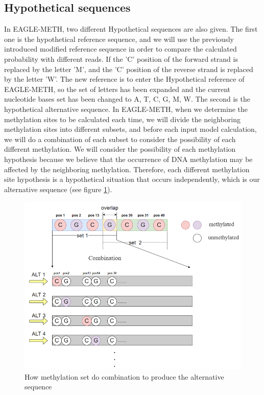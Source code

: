 \documentclass{PHlab-thesis}
\begin{document}
\subsection{Hypothetical sequences}
In EAGLE-METH, two different Hypothetical sequences are also given.
The first one is the hypothetical reference sequence, and we will use the previously introduced modified reference sequence in order to compare the calculated probability with different reads. If the 'C' position of the forward strand is replaced by the letter 'M', and the 'C' position of the reverse strand is replaced by the letter 'W'. The new reference is to enter the Hypothetical reference of EAGLE-METH, so the set of letters has been expanded and the current nucleotide bases set has been changed to A, T, C, G, M, W. The second is the hypothetical alternative sequence. In EAGLE-METH, when we determine the methylation sites to be calculated each time, we will divide the neighboring methylation sites into different subsets, and before each input model calculation, we will do a combination of each subset to consider the possibility of each different methylation. We will consider the possibility of each methylation hypothesis because we believe that the occurrence of DNA methylation may be affected by the neighboring methylation. Therefore, each different methylation site hypothesis is a hypothetical situation that occurs independently, which is our alternative sequence (see figure \ref{fig:meth_set}).

\begin{figure}[h]
  \centering
  \includegraphics[scale=0.8]{figures/meth_set_v2.PNG}
  \caption{How methylation set do combination to produce the alternative sequence}
  \label{fig:meth_set}
\end{figure}
\vfill
\vfill
\end{document}
